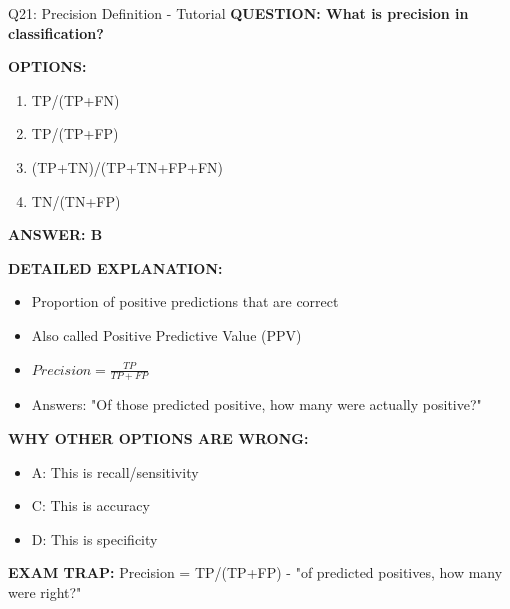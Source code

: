 \documentclass[8pt]{beamer}
\begin{document}
	\begin{frame}{Q21: Precision Definition - Tutorial}
		\fontsize{6.5}{7.5}\selectfont
		\textbf{QUESTION: What is precision in classification?}
		
		\vspace{0.1cm}
		\textbf{OPTIONS:}
		\begin{enumerate}
			\item TP/(TP+FN)
			\item TP/(TP+FP)
			\item (TP+TN)/(TP+TN+FP+FN)
			\item TN/(TN+FP)
		\end{enumerate}
		
		\vspace{0.1cm}
		\textcolor{myblue}{\textbf{ANSWER: B}}
		
		\vspace{0.1cm}
		\textbf{DETAILED EXPLANATION:}
		\begin{itemize}
			\item Proportion of positive predictions that are correct
			\item Also called Positive Predictive Value (PPV)
			\item $Precision = \frac{TP}{TP+FP}$
			\item Answers: "Of those predicted positive, how many were actually positive?"
		\end{itemize}
		
		\vspace{0.1cm}
		\textcolor{myred}{\textbf{WHY OTHER OPTIONS ARE WRONG:}}
		\begin{itemize}
			\item \textcolor{myred}{A:} This is recall/sensitivity
			\item \textcolor{myred}{C:} This is accuracy
			\item \textcolor{myred}{D:} This is specificity
		\end{itemize}
		
		\textcolor{myred}{\textbf{EXAM TRAP:}} Precision = \textcolor{myblue}{TP/(TP+FP)} - "of predicted positives, how many were right?"
	\end{frame}
	
\end{document}
